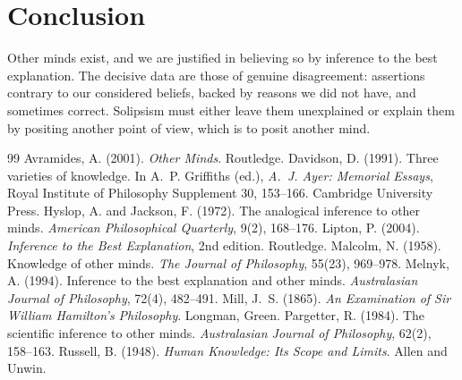\documentclass{situationist-preprint}
\begin{document}
\section{Conclusion}

Other minds exist, and we are justified in believing so by inference to the best explanation. The decisive data are those of genuine disagreement: assertions contrary to our considered beliefs, backed by reasons we did not have, and sometimes correct. Solipsism must either leave them unexplained or explain them by positing another point of view, which is to posit another mind.

\begin{thebibliography}{99}\small
{} Avramides, A. (2001). \emph{Other Minds}. Routledge.
 Davidson, D. (1991). Three varieties of knowledge. In A.~P. Griffiths (ed.), \emph{A.~J. Ayer: Memorial Essays}, Royal Institute of Philosophy Supplement 30, 153--166. Cambridge University Press.
 Hyslop, A. and Jackson, F. (1972). The analogical inference to other minds. \emph{American Philosophical Quarterly}, 9(2), 168--176.
 Lipton, P. (2004). \emph{Inference to the Best Explanation}, 2nd edition. Routledge.
 Malcolm, N. (1958). Knowledge of other minds. \emph{The Journal of Philosophy}, 55(23), 969--978.
 Melnyk, A. (1994). Inference to the best explanation and other minds. \emph{Australasian Journal of Philosophy}, 72(4), 482--491.
 Mill, J.~S. (1865). \emph{An Examination of Sir William Hamilton's Philosophy}. Longman, Green.
 Pargetter, R. (1984). The scientific inference to other minds. \emph{Australasian Journal of Philosophy}, 62(2), 158--163.
 Russell, B. (1948). \emph{Human Knowledge: Its Scope and Limits}. Allen and Unwin.
\end{thebibliography}
\end{document}
